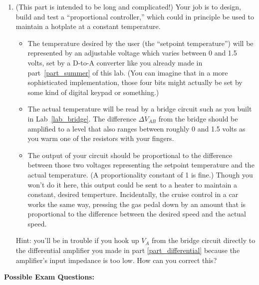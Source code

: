 \begin{enumerate}[wide]
\pagebreak[2]
\item (This part is intended to be long and complicated!)  Your job is to design, build and test a ``proportional controller,'' which could in principle be used to maintain a hotplate at a constant temperature.
\begin{itemize}[nosep]
\item The temperature desired by the user (the ``setpoint temperature'') will be represented by an adjustable voltage which varies between 0 and 1.5 volts, set by a D-to-A converter like you already made in part~\ref{part_summer} of this lab.  (You can imagine that in a more sophisticated implementation, those four bits might actually be set by some kind of digital keypad or something.)
\item The actual temperature will be read by a bridge circuit such as you built in Lab~\ref{lab_bridge}.  The difference $\Delta V_{AB}$ from the bridge should be amplified to a level that also ranges between roughly 0 and 1.5 volts as you warm one of the resistors with your fingers.
\item The output of your circuit should be proportional to the difference between those two voltages representing the setpoint temperature and the actual temperature.  (A proportionality constant of 1 is fine.)  Though you won't do it here, this output could be sent to a heater to maintain a constant, desired temperture.  Incidentally, the cruise control in a car works the same way, pressing the gas pedal down by an amount that is proportional to the difference between the desired speed and the actual speed.
\end{itemize}
Hint: you'll be in trouble if you hook up $V_A$ from the bridge circuit directly to the differential amplifier you made in part \ref{part_differential} because the amplifier's input impedance is too low.  How can you correct this? \label{part_proportional_controller}


\end{enumerate}

\textbf{Possible Exam Questions:}

